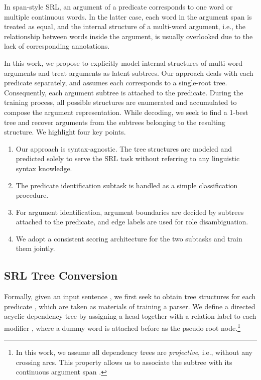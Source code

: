 \documentclass[11pt]{article}
\begin{document}
In span-style SRL, an argument of a predicate corresponds to one word or multiple continuous words.
In the latter case, each word in the argument span is treated as equal, and the internal structure of a multi-word argument, i.e., the relationship between words inside the argument, is usually overlooked due to the lack of corresponding annotations.

In this work, we propose to explicitly model internal structures of multi-word arguments and treat arguments as latent subtrees.
Our approach deals with each predicate separately, and assumes each corresponds to a single-root tree.
Consequently, each argument subtree is attached to the predicate.
During the training process, all possible structures are enumerated and accumulated to compose the argument representation.
While decoding, we seek to find a 1-best tree and recover arguments from the subtrees belonging to the resulting structure.
We highlight four key points.
\begin{enumerate}[leftmargin=15pt,label=\roman*]
    \item Our approach is syntax-agnostic.
          The tree structures are modeled and predicted solely to serve the SRL task without referring to any linguistic syntax knowledge.
    \item The predicate identification subtask is handled as a simple classification procedure.
    \item For argument identification, argument boundaries are decided by subtrees attached to the predicate, and edge labels are used for role disambiguation.
    \item We adopt a consistent scoring architecture for the two subtasks and train them jointly.
\end{enumerate}



\subsection{SRL  Tree Conversion}\label{sec:srl-tree}

Formally, given an input sentence , we first seek to obtain tree structures for each predicate , which are taken as materials of training a parser.
We define a directed acyclic dependency tree  by assigning a head  together with a relation label  to each modifier , where a dummy word  is attached before  as the pseudo root node.\footnote{
    In this work, we assume all dependency trees are \emph{projective}, i.e., without any crossing arcs.
    This property allows us to associate the subtree with its continuous argument span \cite{kong-etal-2015-transforming}.
}
\end{document}
